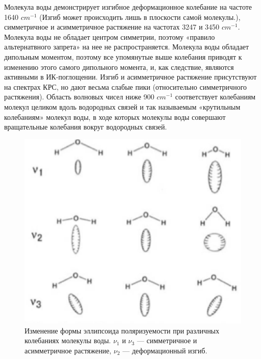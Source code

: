 \documentclass[a4paper,12pt]{article} %
\begin{document}
Молекула воды демонстрирует изгибное деформационное колебание на частоте 1640 ${cm}^{-1}$ (Изгиб может происходить лишь в плоскости самой молекулы.), симметричное и асимметричное растяжение на частотах 3247 и 3450 ${cm}^{-1}$.
Молекула воды не обладает центром симметрии,
поэтому «правило альтернатвного запрета» на нее не распространяется.
Молекула воды обладает дипольным моментом, поэтому все упомянутые выше
колебания приводят к изменению этого самого дипольного момента, и, как
следствие, являются активными в ИК-поглощении.
Изгиб и асимметричное растяжение присутствуют на спектрах КРС, но дают весьма слабые пики (относительно симметричного растяжения). Область волновых чисел ниже 900 ${cm}^{-1}$ соответствует колебаниям молекул целиком вдоль водородных связей и так называемым «крутильным колебаниям» молекул воды, в ходе которых молекулы воды совершают вращательные колебания вокруг водородных связей.

\begin{figure}[h!]
    \centering
    \includegraphics[scale=0.15]{вода.png}
    \caption{Изменение формы эллипсоида
поляризуемости при различных колебаниях
молекулы воды. $\nu_1$ и $\nu_3$ — симметричное и
асимметричное растяжение, $\nu_2$ — деформационный
изгиб.}
    \label{Ber}
\end{figure}
\end{document}
